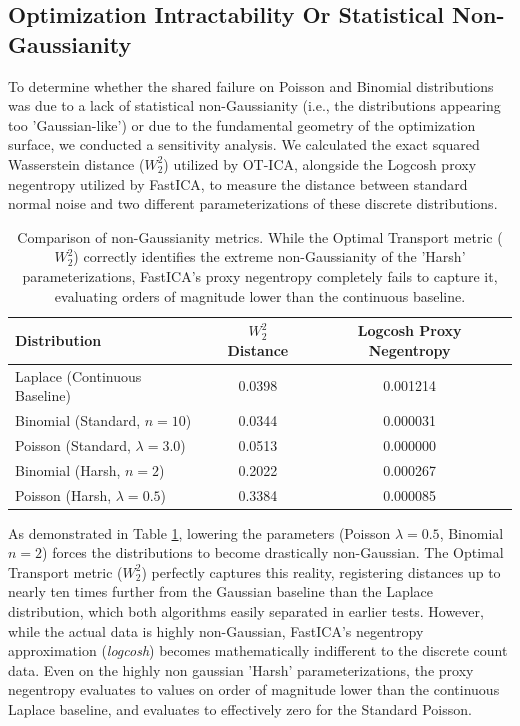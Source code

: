 \documentclass[12pt,a4paper,twoside,openany]{book}
\begin{document}
\subsection{Optimization Intractability Or Statistical Non-Gaussianity}
To determine whether the shared failure on Poisson and Binomial distributions was due to a lack of statistical non-Gaussianity 
(i.e., the distributions appearing too 'Gaussian-like') or due to the fundamental geometry of the optimization surface, 
we conducted a sensitivity analysis. We calculated the exact squared Wasserstein distance ($W_2^2$) utilized by OT-ICA, 
alongside the Logcosh proxy negentropy utilized by FastICA, to measure the distance between standard normal noise and two different parameterizations of these discrete distributions.

\begin{table}[htbp]
    \centering
    \begin{tabular}{lcc}
        \toprule
        \textbf{Distribution} & \textbf{$W_2^2$ Distance} & \textbf{Logcosh Proxy Negentropy} \\
        \midrule
        Laplace (Continuous Baseline) & 0.0398 & 0.001214 \\
        Binomial (Standard, $n=10$) & 0.0344 & 0.000031 \\
        Poisson (Standard, $\lambda=3.0$) & 0.0513 & 0.000000 \\
        Binomial (Harsh, $n=2$) & 0.2022 & 0.000267 \\
        Poisson (Harsh, $\lambda=0.5$) & 0.3384 & 0.000085 \\
        \bottomrule
    \end{tabular}
    \caption[Non-Gaussianity Sensitivity Analysis]{Comparison of non-Gaussianity metrics. While the Optimal Transport metric ($W_2^2$) correctly identifies 
    the extreme non-Gaussianity of the 'Harsh' parameterizations, FastICA's proxy negentropy completely fails to capture it, evaluating orders of magnitude lower than the continuous baseline.}
    \label{tab:w2_sensitivity}
\end{table}

As demonstrated in Table \ref{tab:w2_sensitivity}, lowering the parameters (Poisson $\lambda=0.5$, Binomial $n=2$) forces the distributions to become drastically non-Gaussian. 
The Optimal Transport metric ($W_2^2$) perfectly captures this reality, registering distances up to nearly ten times further from the Gaussian baseline than the Laplace distribution, 
which both algorithms easily separated in earlier tests. However, while the actual data is highly non-Gaussian, FastICA's negentropy approximation (\textit{logcosh}) 
becomes mathematically indifferent to the discrete count data. Even on the highly non gaussian 'Harsh' parameterizations, the proxy negentropy evaluates to values on 
order of magnitude lower than the continuous Laplace baseline, and evaluates to effectively zero for the Standard Poisson. 
\end{document}
